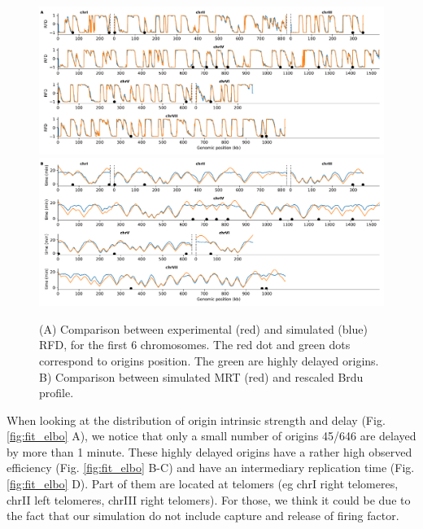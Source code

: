 \documentclass[10pt,a4paper]{revtex4-2}
\begin{document}
\begin{figure}
\includegraphics[width=1.0\textwidth]{figures/rfd_compsub.pdf}
\includegraphics[width=1.0\textwidth]{figures/brdu_repsub.pdf}

\caption{(A) Comparison between experimental (red) and simulated (blue) RFD, for the first 6 chromosomes. The red dot and green dots correspond to origins position. The green are highly delayed origins.  B) Comparison between simulated MRT (red) and rescaled Brdu profile.}\label{fig:fit_rfd}
\end{figure}


When looking at the distribution of origin intrinsic strength and delay (Fig. \ref{fig:fit_elbo} A), we notice that only a small number of origins 45/646 are delayed by more than 1 minute. These highly delayed origins have a rather high observed efficiency (Fig. \ref{fig:fit_elbo} B-C) and have an intermediary replication time (Fig. \ref{fig:fit_elbo} D).
Part of them are located at telomers (eg chrI right telomeres, chrII left telomeres, chrIII right telomers). For those,  we think it could be due to the fact that our simulation do not include capture and release of firing factor. 
\end{document}
